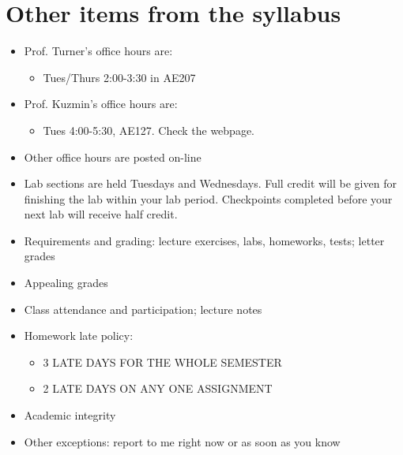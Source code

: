 \documentclass[letterpaper,10pt,english]{sphinxmanual}
\begin{document}
\section{Other items from the syllabus}
\label{\detokenize{lecture_notes/lec01_intro:other-items-from-the-syllabus}}\begin{itemize}
\item {} 
Prof. Turner’s office hours are:
\begin{itemize}
\item {} 
Tues/Thurs 2:00-3:30 in AE207

\end{itemize}

\item {} 
Prof. Kuzmin’s office hours are:
\begin{itemize}
\item {} 
Tues 4:00-5:30, AE127. Check the webpage.

\end{itemize}

\item {} 
Other office hours are posted on-line

\item {} 
Lab sections are held Tuesdays and Wednesdays. Full credit will be given for
finishing the lab within your lab period. Checkpoints completed before your
next lab will receive half credit.

\item {} 
Requirements and grading: lecture exercises, labs, homeworks, tests; letter grades

\item {} 
Appealing grades

\item {} 
Class attendance and participation; lecture notes

\item {} 
Homework late policy:
\begin{itemize}
\item {} 
3 LATE DAYS FOR THE WHOLE SEMESTER

\item {} 
2 LATE DAYS ON ANY ONE ASSIGNMENT

\end{itemize}

\item {} 
Academic integrity

\item {} 
Other exceptions: report to me right now or as soon as you know


\end{itemize}
\end{document}
